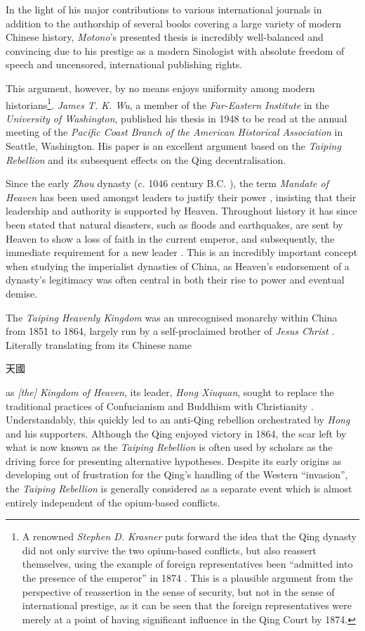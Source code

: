 \documentclass[a4paper,oneside]{article}
\newcommand{\zht}[1]{%
        \begin{CJK*}{UTF8}{bsmi}%
                \normalfont%
                #1
        \end{CJK*}
}
\begin{document}
In the light of his major contributions to various international journals in
addition to the authorship of several books covering a large variety of modern
Chinese history, \textit{Motono}'s presented thesis is incredibly well-balanced
and convincing due to his prestige as a modern Sinologist with absolute freedom
of speech and uncensored, international publishing rights.

This argument, however, by no means enjoys uniformity among modern
historians\footnote{A renowned \textit{Stephen D. Krasner} puts forward the idea
that the Qing dynasty did not only survive the two opium-based conflicts, but
also reassert themselves, using the example of foreign representatives been
``admitted into the presence of the emperor'' in 1874 \autocite{Krasner:2001}.
This is a plausible argument from the perspective of reassertion in the sense of
security, but not in the sense of international prestige, as it can be seen that
the foreign representatives were merely at a point of having significant
influence in the Qing Court by 1874.}. \textit{James T. K. Wu}, a member of the
\textit{Far-Eastern Institute} in the \textit{University of Washington},
published his thesis in 1948 to be read at the annual meeting of the
\textit{Pacific Coast Branch of the American Historical Association} in Seattle,
Washington. His paper is an excellent argument based on the \textit{Taiping
Rebellion} and its subsequent effects on the Qing decentralisation.

Since the early \textit{Zhou} dynasty (c. 1046 century B.C.
\autocite{Loewe:1999}), the term \textit{Mandate of Heaven} has been used
amongst leaders to justify their power \autocite{Zhao:2009}, insisting that
their leadership and authority is supported by Heaven.  Throughout history it
has since been stated that natural disasters, such as floods and earthquakes,
are sent by Heaven to show a loss of faith in the current emperor, and
subsequently, the immediate requirement for a new leader \autocite{Elvin:1998}.
This is an incredibly important concept when studying the imperialist dynasties
of China, as Heaven's endorsement of a dynasty's legitimacy was often central in
both their rise to power and eventual demise.

The \textit{Taiping Heavenly Kingdom} was an unrecognised monarchy within China
from 1851 to 1864, largely run by a self-proclaimed brother of \textit{Jesus
Christ} \autocites{Reilly:2014}{Yap:1954}. Literally translating from its
Chinese name \zht{天國} as \textit{[the] Kingdom of Heaven}, its leader,
\textit{Hong Xiuquan}, sought to replace the traditional practices of
Confucianism and Buddhism with Christianity \autocite{Spence:1996}.
Understandably, this quickly led to an anti-Qing rebellion orchestrated by
\textit{Hong} and his supporters. Although the Qing enjoyed victory in 1864, the
scar left by what is now known as the \textit{Taiping Rebellion} is often used
by scholars as the driving force for presenting alternative hypotheses. Despite
its early origins as developing out of frustration for the Qing's handling of
the Western ``invasion'', the \textit{Taiping Rebellion} is generally considered
as a separate event which is almost entirely independent of the opium-based
conflicts.
\end{document}

